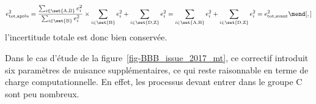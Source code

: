 \begin{equation}
e_\text{tot,après} ^2
=
\frac{\sum_{i\in{\set{\text{A},\text{B}}}} e_i^2}{\sum_{i\in{\set{\text{B}}}} e_i^2}
\times
\sum_{i\in{\set{\text{B}}}} e_i^2
+
\sum_{i\in{\set{\text{D},\text{Z}}}} e_i^2
=
\sum_{i\in{\set{\text{A},\text{B}}}} e_i^2
+
\sum_{i\in{\set{\text{D},\text{Z}}}} e_i^2
=
e_\text{tot,avant} ^2
\mend[,]
\end{equation}
l'incertitude totale est donc bien conservée.
\par
Dans le cas d'étude de la figure~\ref{fig-BBB_issue_2017_mt}, ce correctif introduit six paramètres de nuisance supplémentaires, ce qui reste raisonnable en terme de charge computationnelle.
En effet, les processus devant entrer dans le groupe C sont peu nombreux.